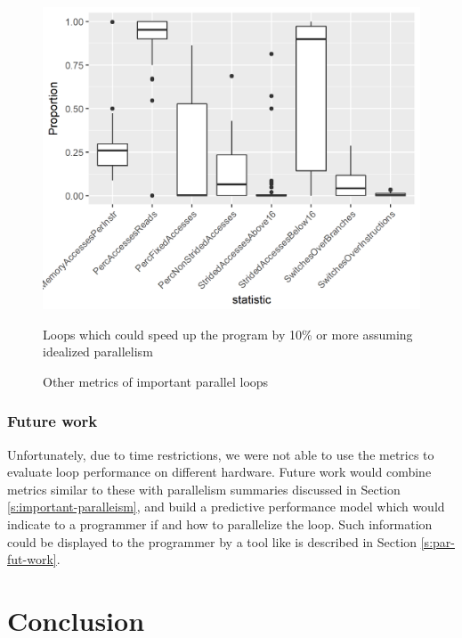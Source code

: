 \documentclass[12pt,twoside]{reedthesis}
\begin{document}
		\begin{figure}
			\caption{Other metrics of important parallel loops}
			\label{fig:other-metrics}
			
			\begin{minipage}{0.6\textwidth} %
				\includegraphics[scale=0.7]{plots/stats_variablility_plot.png}
				{\footnotesize Loops which could speed up the program by 10\% or more assuming idealized parallelism \par}
			\end{minipage}
		\end{figure}
	
		\subsection{Future work}
		
		Unfortunately, due to time restrictions, we were not able to use the metrics to evaluate loop performance on different hardware. Future work would combine metrics similar to these with parallelism summaries discussed in Section \ref{s:important-paralleism}, and build a predictive performance model which would indicate to a programmer if and how to parallelize the loop. Such information could be displayed to the programmer by a tool like is described in Section \ref{s:par-fut-work}.

\chapter*{Conclusion}
	\setcounter{chapter}{4}
	\setcounter{section}{0}
\end{document}
